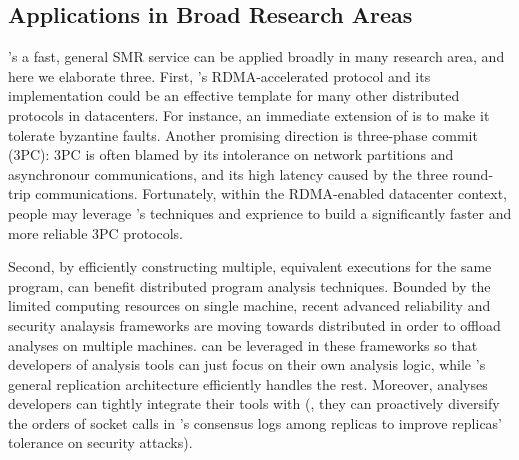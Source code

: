 


\subsection{Applications in Broad Research Areas}\label{sec:apps}

\xxx's a fast, general SMR service can be applied broadly in many research 
area, and here we elaborate three. First, \xxx's RDMA-accelerated \paxos 
protocol and its implementation could be an effective template for 
many other distributed protocols in datacenters. For instance, an immediate 
extension of \xxx is to make it tolerate byzantine faults. Another promising 
direction is three-phase commit (3PC): 3PC is often blamed by its intolerance on 
network partitions and asynchronour communications, and its high latency caused 
by the three round-trip communications. Fortunately, within the RDMA-enabled 
datacenter context, people may leverage \xxx's techniques and exprience to 
build a significantly faster and more reliable 3PC protocols.


Second, by efficiently constructing multiple, equivalent executions for the 
same program, \xxx can benefit distributed program analysis techniques. Bounded 
by the limited computing resources on single machine, recent advanced 
reliability and security analaysis frameworks are moving towards distributed in 
order to offload analyses on multiple machines. \xxx can be leveraged in these 
frameworks so that developers of analysis tools can just focus on their own 
analysis logic, while \xxx's general replication architecture efficiently 
handles the rest. Moreover, analyses developers can tightly integrate their 
tools with \xxx (\eg, they can proactively diversify the orders of socket 
calls in \xxx's consensus logs among replicas to improve replicas' tolerance on
security attacks).


